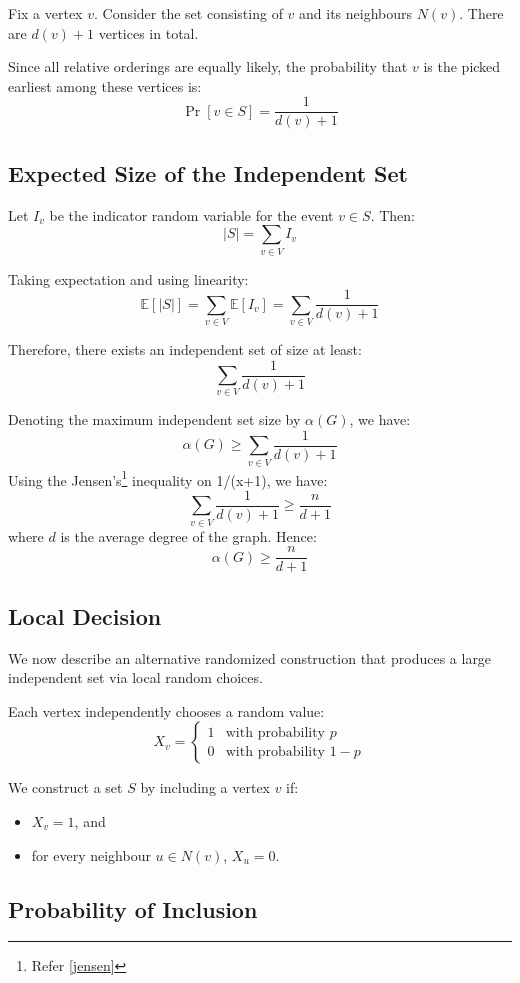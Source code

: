 \documentclass[11pt,openany]{book}
\begin{document}
Fix a vertex \(v\). Consider the set consisting of \(v\) and its neighbours \(N(v)\). There are \(d(v)+1\) vertices in total.

Since all relative orderings are equally likely, the probability that \(v\) is the picked earliest among these vertices is:
\[
\Pr[v \in S] = \frac{1}{d(v)+1}
\]

\subsection*{Expected Size of the Independent Set}

Let \(I_v\) be the indicator random variable for the event \(v \in S\). Then:
\[
|S| = \sum_{v \in V} I_v
\]

Taking expectation and using linearity:
\[
\mathbb{E}[|S|] = \sum_{v \in V} \mathbb{E}[I_v]
= \sum_{v \in V} \frac{1}{d(v)+1}
\]

Therefore, there exists an independent set of size at least:
\[
\sum_{v \in V} \frac{1}{d(v)+1}
\]

Denoting the maximum independent set size by \(\alpha(G)\), we have:
\[\alpha(G) \ge \sum_{v \in V} \frac{1}{d(v)+1}\]
Using the Jensen's\footnote{Refer \autoref{jensen}} inequality on 1/(x+1), we have:
\[
\sum_{v \in V} \frac{1}{d(v)+1} \ge \frac{n}{d+1}
\]
where \(d\) is the average degree of the graph. Hence:
\[
\alpha(G) \ge \frac{n}{d+1}
\]

\subsection{Local Decision}

We now describe an alternative randomized construction that produces a large independent set via local random choices.

Each vertex independently chooses a random value:
\[
X_v =
\begin{cases}
1 & \text{with probability } p \\
0 & \text{with probability } 1-p
\end{cases}
\]

We construct a set \(S\) by including a vertex \(v\) if:
\begin{itemize}
    \item \(X_v = 1\), and
    \item for every neighbour \(u \in N(v)\), \(X_u = 0\).
\end{itemize}

\subsection*{Probability of Inclusion}
\end{document}
